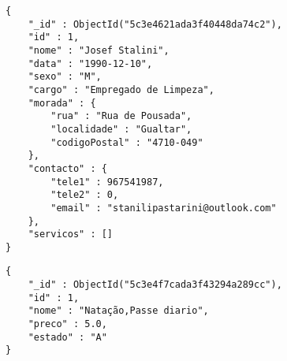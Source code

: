 \begin{lstlisting}[caption={Exemplo de documento: funcionario},label={json:funcionarios}]
{
    "_id" : ObjectId("5c3e4621ada3f40448da74c2"),
    "id" : 1,
    "nome" : "Josef Stalini",
    "data" : "1990-12-10",
    "sexo" : "M",
    "cargo" : "Empregado de Limpeza",
    "morada" : {
        "rua" : "Rua de Pousada",
        "localidade" : "Gualtar",
        "codigoPostal" : "4710-049"
    },
    "contacto" : {
        "tele1" : 967541987,
        "tele2" : 0,
        "email" : "stanilipastarini@outlook.com"
    },
    "servicos" : []
}
\end{lstlisting}

\begin{lstlisting}[caption={Exemplo de documento: servicos},label={json:servicos}]
{
    "_id" : ObjectId("5c3e4f7cada3f43294a289cc"),
    "id" : 1,
    "nome" : "Natação,Passe diario",
    "preco" : 5.0,
    "estado" : "A"
}
\end{lstlisting}